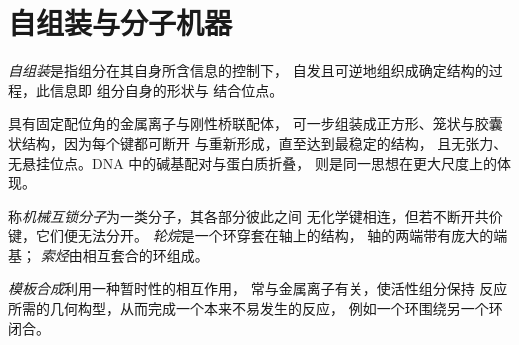 \section{自组装与分子机器}

\begin{definition}[自组装]\label{def:b3:supramolecular:self-assembly}
\emph{自组装}是指组分在其自身所含信息的控制下，
自发且可逆地组织成确定结构的过程，此信息即
组分自身的形状与
结合位点。
\end{definition}

具有固定配位角的金属离子与刚性桥联配体，
可一步组装成正方形、笼状与胶囊状结构，因为每个键都可断开
与重新形成，直至达到最稳定的结构，
且无张力、无悬挂位点。DNA 中的碱基配对与蛋白质折叠，
则是同一思想在更大尺度上的体现。

\begin{definition}[机械互锁分子]\label{def:b3:supramolecular:interlocked}
称\emph{机械互锁分子}为一类分子，其各部分彼此之间
无化学键相连，但若不断开共价键，它们便无法分开。
\emph{轮烷}是一个环穿套在轴上的结构，
轴的两端带有庞大的端基；
\emph{索烃}由相互套合的环组成。
\end{definition}

\begin{definition}[模板合成]\label{def:b3:supramolecular:template}
\emph{模板合成}利用一种暂时性的相互作用，
常与金属离子有关，使活性组分保持
反应所需的几何构型，从而完成一个本来不易发生的反应，
例如一个环围绕另一个环闭合。
\end{definition}

